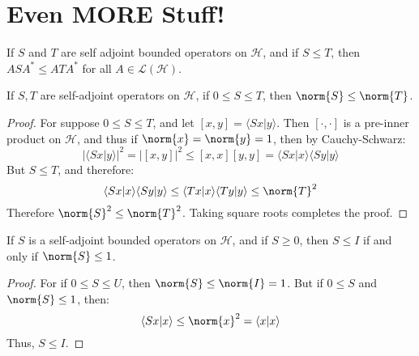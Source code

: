     \section{Even MORE Stuff!}
        \begin{theorem}
            If $S$ and $T$ are self adjoint bounded operators
            on $\mathcal{H}$, and if $S\leq{T}$, then
            $ASA^{*}\leq{A}TA^{*}$ for all
            $A\in\mathscr{L}(\mathcal{H})$.
        \end{theorem}
        \begin{theorem}
            If $S,T$ are self-adjoint operators on $\mathcal{H}$,
            if $0\leq{S}\leq{T}$, then $\norm{S}\leq\norm{T}$.
        \end{theorem}
        \begin{proof}
            For suppose $0\leq{S}\leq{T}$, and let
            $[x,y]=\langle{Sx|y}\rangle$. Then $[\cdot,\cdot]$
            is a pre-inner product on $\mathcal{H}$, and thus
            if $\norm{x}=\norm{y}=1$, then by Cauchy-Schwarz:
            \begin{equation}
                |\langle{Sx|y}\rangle|^{2}=|[x,y]|^{2}
                \leq[x,x][y,y]=
                \langle{Sx|x}\rangle\langle{Sy|y}\rangle
            \end{equation}
            But $S\leq{T}$, and therefore:
            \begin{equation}
                \langle{Sx|x}\rangle\langle{Sy|y}\rangle
                \leq\langle{Tx|x}\rangle\langle{Ty|y}\rangle
                \leq\norm{T}^{2}
            \end{equation}
            Therefore $\norm{S}^{2}\leq\norm{T}^{2}$. Taking
            square roots completes the proof.
        \end{proof}
        \begin{theorem}
            If $S$ is a self-adjoint bounded operators on
            $\mathcal{H}$, and if $S\geq{0}$, then
            $S\leq{I}$ if and only if $\norm{S}\leq{1}$.
        \end{theorem}
        \begin{proof}
            For if $0\leq{S}\leq{U}$, then
            $\norm{S}\leq\norm{I}=1$. But if $0\leq{S}$ and
            $\norm{S}\leq{1}$, then:
            \begin{equation}
                \langle{Sx|x}\rangle\leq\norm{x}^{2}=
                \langle{x|x}\rangle
            \end{equation}
            Thus, $S\leq{I}$.
        \end{proof}
